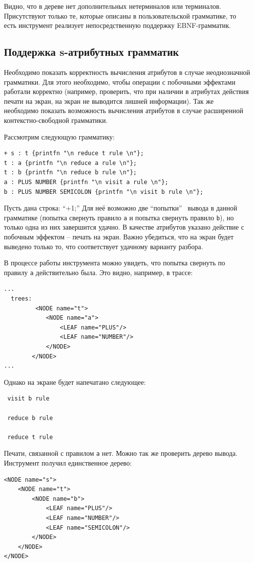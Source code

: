 Видно, что в дереве нет дополнительных нетерминалов или терминалов. Присутствуют только те, которые описаны в пользовательской грамматике, то есть инструмент реализует непосредственную поддержку EBNF-грамматик.


\subsection{Поддержка s-атрибутных грамматик}

 Необходимо показать корректность вычисления атрибутов в случае неоднозначной грамматики. Для этого необходимо, чтобы операции с побочными эффектами работали корректно (например, проверить, что при наличии в атрибутах действия печати на экран, на экран  не выводится лишней информации). Так же необходимо показать возможность вычисления атрибутов в случае расширенной контекстно-свободной  грамматики. 

Рассмотрим следующую грамматику:
\begin{verbatim}
+ s : t {printfn "\n reduce t rule \n"};
t : a {printfn "\n reduce a rule \n"};
t : b {printfn "\n reduce b rule \n"};
a : PLUS NUMBER {printfn "\n visit a rule \n"};
b : PLUS NUMBER SEMICOLON {printfn "\n visit b rule \n"};
\end{verbatim}

Пусть дана строка: "`+1;"' Для неё возможно две "`попытки"' \ вывода в данной грамматике (попытка свернуть правило \verb|a| и попытка свернуть правило \verb|b|), но только одна из них завершится удачно. В качестве атрибутов указано действие с побочным эффектом -- печать на экран. Важно убедиться, что на экран будет выведено только то, что соответствует удачному варианту разбора.

В процессе работы инструмента можно увидеть, что попытка свернуть по правилу \verb|a|  действительно была. Это видно, например, в трассе:
\begin{verbatim}
...
  trees:
         <NODE name="t">
            <NODE name="a">
                <LEAF name="PLUS"/>
                <LEAF name="NUMBER"/>
            </NODE>
        </NODE>
...
\end{verbatim}

Однако на экране будет напечатано следующее:
\begin{verbatim}
 visit b rule

 reduce b rule

 reduce t rule
\end{verbatim}

Печати, связанной с правилом  \verb|a| нет. Можно так же проверить дерево вывода. Инструмент получил единственное дерево:
\begin{verbatim}
<NODE name="s">
    <NODE name="t">
        <NODE name="b">
            <LEAF name="PLUS"/>
            <LEAF name="NUMBER"/>
            <LEAF name="SEMICOLON"/>
        </NODE>
    </NODE>
</NODE>
\end{verbatim}

